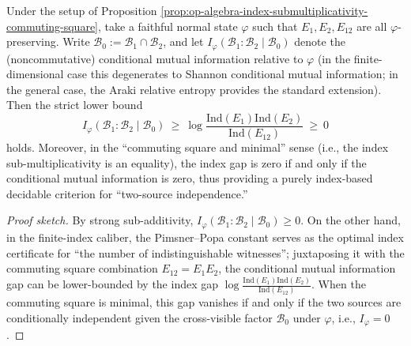 \begin{corollary}\label{cor:op-algebra-cmi-lower-bound-by-index-gap}
Under the setup of Proposition \ref{prop:op-algebra-index-submultiplicativity-commuting-square}, take a faithful normal state \(\varphi\) such that \(E_1,E_2,E_{12}\) are all \(\varphi\)-preserving.
Write \(\mathcal{B}_0:=\mathcal{B}_1\cap\mathcal{B}_2\), and let
\(
I_\varphi(\mathcal{B}_1:\mathcal{B}_2\mid\mathcal{B}_0)
\)
denote the (noncommutative) conditional mutual information relative to \(\varphi\) (in the finite-dimensional case this degenerates to Shannon conditional mutual information; in the general case, the Araki relative entropy provides the standard extension).
Then the strict lower bound
\[
\boxed{\;
I_\varphi(\mathcal{B}_1:\mathcal{B}_2\mid\mathcal{B}_0)
\ \ge\
\log\frac{\mathrm{Ind}(E_1)\mathrm{Ind}(E_2)}{\mathrm{Ind}(E_{12})}
\ \ge\ 0\;}
\]
holds.
Moreover, in the ``commuting square and minimal'' sense (i.e., the index sub-multiplicativity is an equality), the index gap is zero if and only if the conditional mutual information is zero, thus providing a purely index-based decidable criterion for ``two-source independence.''
\end{corollary}
\begin{proof}[Proof sketch]
By strong sub-additivity, \(I_\varphi(\mathcal{B}_1:\mathcal{B}_2\mid\mathcal{B}_0)\ge 0\).
On the other hand, in the finite-index caliber, the Pimsner--Popa constant serves as the optimal index certificate for ``the number of indistinguishable witnesses''; juxtaposing it with the commuting square combination \(E_{12}=E_1E_2\), the conditional mutual information gap can be lower-bounded by the index gap \(\log\frac{\mathrm{Ind}(E_1)\mathrm{Ind}(E_2)}{\mathrm{Ind}(E_{12})}\).
When the commuting square is minimal, this gap vanishes if and only if the two sources are conditionally independent given the cross-visible factor \(\mathcal{B}_0\) under \(\varphi\), i.e., \(I_\varphi=0\). \qedhere
\end{proof}


